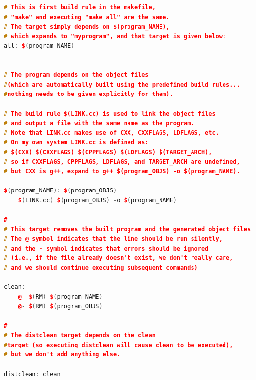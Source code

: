 \documentclass[paper=8.5in:11in, twoside, 12pt, pagesize=pdftex]{book}
\begin{document}
\begin{lstlisting}[frame=single,  basicstyle=\small, language=c++, mathescape=false]
# This is first build rule in the makefile, 
# "make" and executing "make all" are the same.
# The target simply depends on $(program_NAME), 
# which expands to "myprogram", and that target is given below:
all: $(program_NAME)


# The program depends on the object files 
#(which are automatically built using the predefined build rules... 
#nothing needs to be given explicitly for them).

# The build rule $(LINK.cc) is used to link the object files
# and output a file with the same name as the program. 
# Note that LINK.cc makes use of CXX, CXXFLAGS, LDFLAGS, etc.
# On my own system LINK.cc is defined as: 
# $(CXX) $(CXXFLAGS) $(CPPFLAGS) $(LDFLAGS) $(TARGET_ARCH),
# so if CXXFLAGS, CPPFLAGS, LDFLAGS, and TARGET_ARCH are undefined,
# but CXX is g++, expand to g++ $(program_OBJS) -o $(program_NAME).

$(program_NAME): $(program_OBJS)
    $(LINK.cc) $(program_OBJS) -o $(program_NAME)

#
# This target removes the built program and the generated object files. 
# The @ symbol indicates that the line should be run silently, 
# and the - symbol indicates that errors should be ignored 
# (i.e., if the file already doesn't exist, we don't really care, 
# and we should continue executing subsequent commands)

clean:
    @- $(RM) $(program_NAME)
    @- $(RM) $(program_OBJS)

#
# The distclean target depends on the clean
#target (so executing distclean will cause clean to be executed), 
# but we don't add anything else.

distclean: clean
\end{lstlisting}


\ifdefined\autotools
\end{document}
